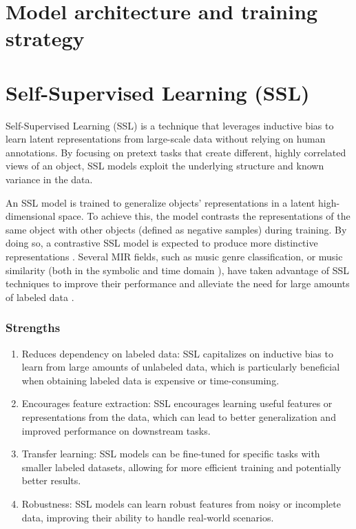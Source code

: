 \section{Model architecture and training strategy}
\section{Self-Supervised Learning (SSL)}
Self-Supervised Learning (SSL) is a technique that leverages inductive bias to learn latent representations from large-scale data without relying on human annotations. By focusing on pretext tasks that create different, highly correlated views of an object, SSL models exploit the underlying structure and known variance in the data. 

An SSL model is trained to generalize objects' representations in a latent high-dimensional space. To achieve this, the model contrasts the representations of the same object with other objects (defined as negative samples) during training. By doing so, a contrastive SSL model is expected to produce more distinctive representations \cite{audioselfsupsurvey}. Several MIR fields, such as music genre classification, or music similarity (both in the symbolic \cite{musicviaselfsup} and time domain \cite{epidemic}), have taken advantage of SSL techniques to improve their performance and alleviate the need for large amounts of labeled data \cite{audioselfsupsurvey}.

\subsubsection{Strengths}

\begin{enumerate}
    \item Reduces dependency on labeled data: SSL capitalizes on inductive bias to learn from large amounts of unlabeled data, which is particularly beneficial when obtaining labeled data is expensive or time-consuming.
    \item Encourages feature extraction: SSL encourages learning useful features or representations from the data, which can lead to better generalization and improved performance on downstream tasks.
    \item Transfer learning: SSL models can be fine-tuned for specific tasks with smaller labeled datasets, allowing for more efficient training and potentially better results.
    \item Robustness: SSL models can learn robust features from noisy or incomplete data, improving their ability to handle real-world scenarios.
\end{enumerate}

